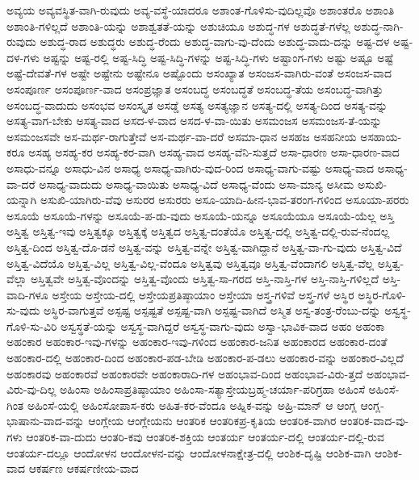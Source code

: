 {ಅವ್ಯಯ
ಅವ್ಯವಸ್ಥಿತ-ವಾಗಿ-ರುವುದು
ಅವ್ಯ-ವಸ್ಥೆ-ಯಾದರೂ
ಅಶಾಂತ-ಗೊಳಿಸು-ವುದಿಲ್ಲವೊ
ಅಶಾಂತರೊ
ಅಶಾಂತಿ
ಅಶಾಂತಿ-ಗಳಿಲ್ಲದೆ
ಅಶಾಂತಿ-ಯನ್ನು
ಅಶಾಶ್ವತತೆ-ಯನ್ನು
ಅಶುಚಿಯೂ
ಅಶುದ್ಧ-ಗಳ
ಅಶುದ್ಧತೆ-ಗಳೆಲ್ಲ
ಅಶುದ್ಧ-ನಾಗಿ-ರುವುದು
ಅಶುದ್ಧ-ರಾದ
ಅಶುದ್ಧರು
ಅಶುದ್ಧ-ರೆಂದು
ಅಶುದ್ಧ-ವಾಗು-ವು-ದೆಂದು
ಅಶುದ್ಧ-ವಾದು-ದನ್ನು
ಅಷ್ಟ-ದಳ
ಅಷ್ಟ-ದಳ-ಗಳು
ಅಷ್ಟನ್ನು
ಅಷ್ಟ-ರಲ್ಲಿ
ಅಷ್ಟ-ಸಿದ್ಧಿ
ಅಷ್ಟ-ಸಿದ್ಧಿ-ಗಳನ್ನು
ಅಷ್ಟ-ಸಿದ್ಧಿ-ಗಳು
ಅಷ್ಟಾಂಗ-ಗಳು
ಅಷ್ಟು
ಅಷ್ಟೂ
ಅಷ್ಟೆ
ಅಷ್ಟೆ-ದೇವತೆ-ಗಳ
ಅಷ್ಟೇ
ಅಷ್ಟೇನು
ಅಷ್ಟೇನೂ
ಅಷ್ಟೊಂದು
ಅಸಂಖ್ಯಾತ
ಅಸಂಜಸ-ವಾಗಿರು-ವಂತೆ
ಅಸಂಜಸ-ವಾದ
ಅಸಂಪೂರ್ಣ
ಅಸಂಪೂರ್ಣ-ವಾದ
ಅಸಂಪ್ರಜ್ಞಾತ
ಅಸಂಬದ್ಧ
ಅಸಂಬದ್ಧತೆ
ಅಸಂಬದ್ಧ-ತೆಯ
ಅಸಂಬದ್ಧ-ವಾಗಿತ್ತು
ಅಸಂಬದ್ಧ-ವಾದುದು
ಅಸಂಭವ
ಅಸಂಸ್ಕೃತ
ಅಸಡ್ಡೆ
ಅಸತ್ಯ
ಅಸತ್ಯಜ್ಞಾನ
ಅಸತ್ಯ-ದಲ್ಲಿ
ಅಸತ್ಯ-ದಿಂದ
ಅಸತ್ಯ-ವನ್ನು
ಅಸತ್ಯ-ವಾಗ-ಬೇಕು
ಅಸತ್ಯ-ವಾದ
ಅಸದ-ಳ-ವಾದ
ಅಸದ-ಳ-ವಾ-ಯಿತು
ಅಸಮಂಜಸ
ಅಸಮಂಜಸ-ತೆ-ಯನ್ನು
ಅಸಮಂಜಸವೇ
ಅಸ-ಮರ್ಥ-ರಾಗುತ್ತೇವೆ
ಅಸ-ಮರ್ಥ-ವಾ-ದರೆ
ಅಸಮಾ-ಧಾನ
ಅಸಹಜ
ಅಸಹನೀಯ
ಅಸಹಾಯ-ಕರೂ
ಅಸಹ್ಯ
ಅಸಹ್ಯ-ಕರ
ಅಸಹ್ಯ-ಕರ-ವಾಗಿ
ಅಸಹ್ಯ-ವಾದ
ಅಸಹ್ಯ-ವೆನಿ-ಸುತ್ತದೆ
ಅಸಾ-ಧಾರಣ
ಅಸಾ-ಧಾರಣ-ವಾದ
ಅಸಾಧು-ವನ್ನೂ
ಅಸಾಧು-ವಿನ
ಅಸಾಧ್ಯ
ಅಸಾಧ್ಯ-ವಾಗಿರು-ವುದ-ರಿಂದ
ಅಸಾಧ್ಯ-ವಾಗು-ವಷ್ಟು
ಅಸಾಧ್ಯ-ವಾದ
ಅಸಾಧ್ಯ-ವಾ-ದರೆ
ಅಸಾಧ್ಯ-ವಾದುದು
ಅಸಾಧ್ಯ-ವಾಯಿತು
ಅಸಾಧ್ಯ-ವಿದೆ
ಅಸಾಧ್ಯ-ವೆಂದು
ಅಸಾ-ಮಾನ್ಯ
ಅಸೀಮ
ಅಸುಖಿ-ಯನ್ನಾಗಿ
ಅಸುಖಿ-ಯಾಗಿರು-ವೆವು
ಅಸುರರ
ಅಸುರರು
ಅಸೂ-ಯಾದಿ-ಹೀನ-ಭಾವ-ತರಂಗ-ಗಳಿಂದ
ಅಸೂಯಾ-ಪರರು
ಅಸೂಯೆ
ಅಸೂಯೆ-ಗಳನ್ನು
ಅಸೂಯೆ-ಪ-ಡು-ವುದು
ಅಸೂಯೆ-ಯನ್ನೂ
ಅಸೂಯೆಯೂ
ಅಸೂಯೆ-ಯೆಲ್ಲ
ಅಸ್ತಿ
ಅಸ್ತಿತ್ವ
ಅಸ್ತಿತ್ವ-ಇವು
ಅಸ್ತಿತ್ವಕ್ಕೂ
ಅಸ್ತಿತ್ವಕ್ಕೆ
ಅಸ್ತಿತ್ವದ
ಅಸ್ತಿತ್ವ-ದಂತೆಯೊ
ಅಸ್ತಿತ್ವ-ದಲ್ಲಿ
ಅಸ್ತಿತ್ವ-ದಲ್ಲಿ-ರುವ-ನೆಂದಲ್ಲ
ಅಸ್ತಿತ್ವ-ದಿಂದ
ಅಸ್ತಿತ್ವ-ದೊ-ಡನೆ
ಅಸ್ತಿತ್ವ-ವನ್ನು
ಅಸ್ತಿತ್ವ-ವನ್ನೇ
ಅಸ್ತಿತ್ವ-ವಾಗಿದ್ದಾನೆ
ಅಸ್ತಿತ್ವ-ವಾ-ಗು-ವುದು
ಅಸ್ತಿತ್ವ-ವಿದೆ
ಅಸ್ತಿತ್ವ-ವಿದೆಯೊ
ಅಸ್ತಿತ್ವ-ವಿಲ್ಲ
ಅಸ್ತಿತ್ವ-ವಿಲ್ಲ-ವೆಂದೂ
ಅಸ್ತಿತ್ವವು
ಅಸ್ತಿತ್ವವೂ
ಅಸ್ತಿತ್ವ-ವೆಂದಾಗಲಿ
ಅಸ್ತಿತ್ವ-ವೆಲ್ಲ
ಅಸ್ತಿತ್ವ-ವೆಲ್ಲಾ
ಅಸ್ತಿತ್ವವೇ
ಅಸ್ತಿತ್ವ-ವೊಂದನ್ನು
ಅಸ್ತಿತ್ವ-ವೊಂದು
ಅಸ್ತಿತ್ವ-ಸಾ-ಗರದ
ಅಸ್ತಿ-ನಾಸ್ತಿ-ಗಳ
ಅಸ್ತಿ-ನಾಸ್ತಿ-ಗಳಿಲ್ಲದೆ
ಅಸ್ತಿ-ವಾದಿ-ಗಳೂ
ಅಸ್ತೇಯ
ಅಸ್ತೇಯ-ದಲ್ಲಿ
ಅಸ್ತೇಯಪ್ರತಿಷ್ಠಾಯಾಂ
ಅಸ್ತೇಯಾ
ಅಸ್ತ್ರ-ಗಳಿವೆ
ಅಸ್ತ್ರ-ಗಳೆ
ಅಸ್ಥಿರ
ಅಸ್ಥಿರ-ಗೊಳಿ-ಸು-ವುದು
ಅಸ್ಥಿರ-ವಾಗುತ್ತವೆ
ಅಸ್ಪಷ್ಟ
ಅಸ್ಪಷ್ಟತೆ
ಅಸ್ಪಷ್ಟ-ವಾಗಿ
ಅಸ್ಪಷ್ಟ-ವಾಗಿದೆ
ಅಸ್ಮಿತ
ಅಸ್ವ-ತಂತ್ರ-ರೆಂಬು-ದನ್ನು
ಅಸ್ವಸ್ಥ-ಗೊಳಿ-ಸು-ವಿರಿ
ಅಸ್ವಸ್ಥತೆ-ಯನ್ನು
ಅಸ್ವಸ್ಥ-ವಾಗಿದ್ದರೆ
ಅಸ್ವಸ್ಥ-ವಾಗು-ವುದು
ಅಸ್ವಾ-ಭಾವಿಕ-ವಾದ
ಅಹಂ
ಅಹಂಕಾ
ಅಹಂಕಾರ
ಅಹಂಕಾರ-ಇವು-ಗಳನ್ನು
ಅಹಂಕಾರ-ಇವು-ಗಳಿಂದ
ಅಹಂಕಾರ-ಜನಿತ
ಅಹಂಕಾರದ
ಅಹಂಕಾರ-ದಂತೆ
ಅಹಂಕಾರ-ದಲ್ಲಿ
ಅಹಂಕಾರ-ದಿಂದ
ಅಹಂಕಾರ-ಪಡ-ಬೇಡಿ
ಅಹಂಕಾರ-ಪ-ಡಲು
ಅಹಂಕಾರ-ವನ್ನು
ಅಹಂಕಾರ-ವಿಲ್ಲದೆ
ಅಹಂಕಾರವು
ಅಹಂಕಾರವೆ
ಅಹಂಕಾರವೇ
ಅಹಂಕಾರಾದಿ-ಗಳ
ಅಹಂಭಾವ-ದಿಂದ
ಅಹಂಭಾವ-ವಿರು-ತ್ತದೆ
ಅಹಂಭಾವ-ವಿರು-ವು-ದಿಲ್ಲ
ಅಹಿಂಸಾ
ಅಹಿಂಸಾಪ್ರತಿಷ್ಠಾಯಾಂ
ಅಹಿಂಸಾ-ಸತ್ಯಾಸ್ತೇಯಬ್ರಹ್ಮ-ಚರ್ಯಾ-ಪರಿಗ್ರಹಾ
ಅಹಿಂಸೆ
ಅಹಿಂಸೆ-ಗಿಂತ
ಅಹಿಂಸೆ-ಯಲ್ಲಿ
ಅಹಿಂಸೋಪಾಸ-ಕರು
ಅಹಿತ-ಕರ-ವೆಂದೂ
ಅಹ್ನಿಕ-ವನ್ನು
ಅಹ್ರಿ-ಮಾನ್
ಆ
ಆಂಗ್ಲ
ಆಂಗ್ಲ-ಭಾಷಾನು-ವಾದ-ವನ್ನು
ಆಂಗ್ಲೇಯ
ಆಂಗ್ಲೇಯನು
ಆಂತರಿಕ
ಆಂತರಿಕಪ್ರ-ಕೃತಿಯ
ಆಂತರಿಕ-ವಾಗಿರ
ಆಂತರಿಕ-ವಾದ-ವು-ಗಳು
ಆಂತರಿಕ-ವಾ-ದುದು
ಆಂತರಿ-ಕವು
ಆಂತರಿಕ-ಶಕ್ತಿಯ
ಆಂತರ್ಯ
ಆಂತರ್ಯ-ದಲ್ಲಿ
ಆಂತರ್ಯ-ದಲ್ಲಿ-ರುವ
ಆಂತರ್ಯ-ದಲ್ಲೂ
ಆಂದೋಳನ
ಆಂದೋಳನ-ವನ್ನು
ಆಂದೋಳನಾಕ್ಷೇತ್ರ-ದಲ್ಲಿ
ಆಂಶಿಕ-ದೃಷ್ಟಿ
ಆಂಶಿಕ-ವಾಗಿ
ಆಂಶಿಕ-ವಾದ
ಆಕರ್ಷಣ
ಆಕರ್ಷಣೀಯ-ವಾದ
}
